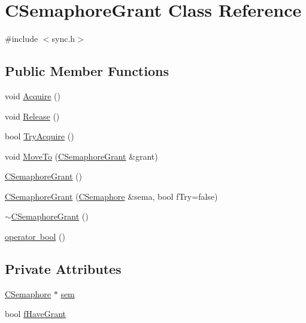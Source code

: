 \hypertarget{class_c_semaphore_grant}{}\section{C\+Semaphore\+Grant Class Reference}
\label{class_c_semaphore_grant}


{\ttfamily \#include $<$sync.\+h$>$}

\subsection*{Public Member Functions}
\begin{DoxyCompactItemize}
\item 
void \mbox{\hyperlink{class_c_semaphore_grant_ac52976968379ea8e2470cfba877c3e89}{Acquire}} ()
\item 
void \mbox{\hyperlink{class_c_semaphore_grant_a8d985eeace74e037baeb39bd2d586576}{Release}} ()
\item 
bool \mbox{\hyperlink{class_c_semaphore_grant_a9952d9ea087ced803c099f69992ebb1d}{Try\+Acquire}} ()
\item 
void \mbox{\hyperlink{class_c_semaphore_grant_ab3e6f84f304703abc52517b0c8de26cf}{Move\+To}} (\mbox{\hyperlink{class_c_semaphore_grant}{C\+Semaphore\+Grant}} \&grant)
\item 
\mbox{\hyperlink{class_c_semaphore_grant_a84ca79a4c8519f1a69697c060cabc51d}{C\+Semaphore\+Grant}} ()
\item 
\mbox{\hyperlink{class_c_semaphore_grant_a5998c457c7c223a8257166161d12b355}{C\+Semaphore\+Grant}} (\mbox{\hyperlink{class_c_semaphore}{C\+Semaphore}} \&sema, bool f\+Try=false)
\item 
\mbox{\hyperlink{class_c_semaphore_grant_aaba5579eb3ad3647d79e71c9970dcb54}{$\sim$\+C\+Semaphore\+Grant}} ()
\item 
\mbox{\hyperlink{class_c_semaphore_grant_a91458b860e45949d87d770252e590a9b}{operator bool}} ()
\end{DoxyCompactItemize}
\subsection*{Private Attributes}
\begin{DoxyCompactItemize}
\item 
\mbox{\hyperlink{class_c_semaphore}{C\+Semaphore}} $\ast$ \mbox{\hyperlink{class_c_semaphore_grant_afed7f1f7ac912c175dcd9c898fa4e2ed}{sem}}
\item 
bool \mbox{\hyperlink{class_c_semaphore_grant_a0c416dd364ca4d085555d69658c060e3}{f\+Have\+Grant}}
\end{DoxyCompactItemize}


